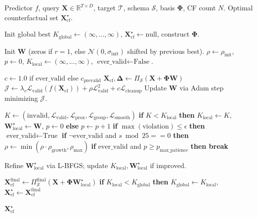 \documentclass[runningheads]{llncs}
\begin{document}
	\begin{algorithm}[H]
		\caption{Basis-Guided Counterfactual Generation}
		\label{alg:basis_cf}
		\begin{algorithmic}[1]
			\Require Predictor $f$, query $\mathbf{X} \in \mathbb{R}^{T \times D}$, target $\mathcal{T}$, schema $\mathcal{S}$, basis $\mathbf{\Phi}$, CF count $N$.
			\Ensure Optimal counterfactual set $\mathbf{X}_{\mathrm{cf}}^{\star}$.
			
			\State Init global best $K_{\mathrm{global}} \gets (\infty, \dots, \infty)$, $\mathbf{X}_{\mathrm{cf}}^{\star} \gets \text{null}$, construct $\mathbf{\Phi}$.
			
			\State Init $\mathbf{W}$ (zeros if $r=1$, else $\mathcal{N}(0, \sigma_{\mathrm{init}})$ shifted by previous best).
			\State $\rho \gets \rho_{\mathrm{init}}$, $p \gets 0$, $K_{\mathrm{local}} \gets (\infty, \dots, \infty)$, $\text{ever\_valid} \gets \text{False}$.
			
			 
			\State $c \gets 1.0$ if $\text{ever\_valid}$ else $c_{\mathrm{prevalid}}$
			\State $\mathbf{X}_{\mathrm{cf}}, \mathbf{\Delta} \gets \Pi_{\mathcal{S}}(\mathbf{X} + \mathbf{\Phi}\mathbf{W})$ 
			\State $\mathcal{J} \gets \lambda_v \mathcal{L}_{\mathrm{valid}}(f(\mathbf{X}_{\mathrm{cf}})) + \rho \mathcal{L}_{\mathrm{valid}}^2 + c \mathcal{L}_{\mathrm{cleanup}}$
			\State Update $\mathbf{W}$ via Adam step minimizing $\mathcal{J}$.
			
			\State $K \gets (\text{invalid}, \mathcal{L}_{\mathrm{valid}}, \mathcal{L}_{\mathrm{prox}}, \mathcal{L}_{\mathrm{group}}, \mathcal{L}_{\mathrm{smooth}})$
			\State \textbf{if} $K < K_{\mathrm{local}}$ \textbf{then} $K_{\mathrm{local}} \gets K$, $\mathbf{W}_{\mathrm{local}}^{\star} \gets \mathbf{W}$, $p \gets 0$ \textbf{else} $p \gets p + 1$
			\State \textbf{if} $\max(\text{violation}) \le \epsilon$ \textbf{then} $\text{ever\_valid} \gets \text{True}$
			\State \textbf{if} $\neg \text{ever\_valid}$ and $s \bmod 25 == 0$ \textbf{then} $\rho \gets \min(\rho \cdot \rho_{\mathrm{growth}}, \rho_{\mathrm{max}})$
			\State \textbf{if} $\text{ever\_valid}$ and $p \ge p_{\mathrm{max\_patience}}$ \textbf{then break}
			\EndFor
			
			 
			\State Refine $\mathbf{W}_{\mathrm{local}}^{\star}$ via L-BFGS; update $K_{\mathrm{local}}, \mathbf{W}_{\mathrm{local}}^{\star}$ if improved.
			\EndIf
			
			\State $\mathbf{X}_{\mathrm{cf}}^{\mathrm{final}} \gets \Pi_{\mathcal{S}}^{\mathrm{final}}(\mathbf{X} + \mathbf{\Phi}\mathbf{W}_{\mathrm{local}}^{\star})$ 
			\State \textbf{if} $K_{\mathrm{local}} < K_{\mathrm{global}}$ \textbf{then} $K_{\mathrm{global}} \gets K_{\mathrm{local}}$, $\mathbf{X}_{\mathrm{cf}}^{\star} \gets \mathbf{X}_{\mathrm{cf}}^{\mathrm{final}}$
			\EndFor
			
			\State \Return $\mathbf{X}_{\mathrm{cf}}^{\star}$
		\end{algorithmic}
	\end{algorithm}
	
\end{document}
